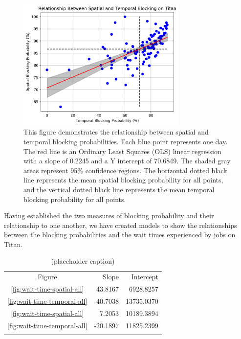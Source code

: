 \begin{figure}
  \includegraphics[width=0.75\textwidth]{images/linfit-spatial-vs-temporal-by-day.png}
\caption{This figure demonstrates the relationship between spatial and temporal
blocking probabilities. Each blue point represents one day. The red line is an
Ordinary Least Squares (OLS) linear regression with a slope of 0.2245 and a Y
intercept of 70.6849. The shaded gray areas represent 95\% confidence regions.
The horizontal dotted black line represents the mean spatial blocking
probability for all points, and the vertical dotted black line represents the
mean temporal blocking probability for all points.}
\label{fig:spatial-vs-temporal}
\end{figure}


Having established the two measures of blocking probability and their
relationship to one another, we have created models to show the relationships
between the blocking probabilities and the wait times experienced by jobs on
Titan.

\begin{table}
\caption{(placeholder caption)}
\label{tab:wait-time-params}       %
\begin{tabular}{crr}
\hline\noalign{\smallskip}
Figure  & Slope   & Intercept   \\
\noalign{\smallskip}\hline\noalign{\smallskip}
\ref{fig:wait-time-spatial-all}     &    43.8167    &    6928.8257  \\
\ref{fig:wait-time-temporal-all}    &   -40.7038    &   13735.0370  \\
\ref{fig:wait-time-spatial-all}     &     7.2053    &   10189.3894  \\
\ref{fig:wait-time-temporal-all}    &   -20.1897    &   11825.2399  \\
\noalign{\smallskip}\hline
\end{tabular}
\end{table}


